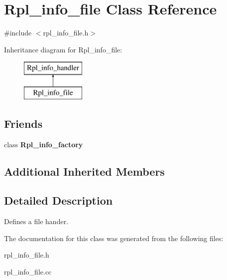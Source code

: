 \hypertarget{classRpl__info__file}{}\section{Rpl\+\_\+info\+\_\+file Class Reference}
\label{classRpl__info__file}


{\ttfamily \#include $<$rpl\+\_\+info\+\_\+file.\+h$>$}

Inheritance diagram for Rpl\+\_\+info\+\_\+file\+:\begin{figure}[H]
\begin{center}
\leavevmode
\includegraphics[height=2.000000cm]{classRpl__info__file}
\end{center}
\end{figure}
\subsection*{Friends}
\begin{DoxyCompactItemize}
\item 
\mbox{\label{classRpl__info__file_a78a99f8bbca705e7958bb3ffaac85abd}} 
class {\bfseries Rpl\+\_\+info\+\_\+factory}
\end{DoxyCompactItemize}
\subsection*{Additional Inherited Members}


\subsection{Detailed Description}
Defines a file hander. 

The documentation for this class was generated from the following files\+:\begin{DoxyCompactItemize}
\item 
rpl\+\_\+info\+\_\+file.\+h\item 
rpl\+\_\+info\+\_\+file.\+cc\end{DoxyCompactItemize}

